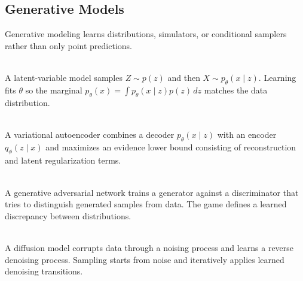 \subsection{Generative Models}

Generative modeling learns distributions, simulators, or conditional samplers rather than only point predictions.

\begin{definition} \label{def:sl-latent-variable-generative-model} \\
A latent-variable model samples $Z\sim p(z)$ and then $X\sim p_{\theta}(x\mid z)$.  Learning fits $\theta$ so the marginal $p_{\theta}(x)=\int p_{\theta}(x\mid z)p(z)\,dz$ matches the data distribution.
\end{definition}

\begin{definition} \label{def:sl-variational-autoencoder} \\
A variational autoencoder combines a decoder $p_{\theta}(x\mid z)$ with an encoder $q_{\phi}(z\mid x)$ and maximizes an evidence lower bound consisting of reconstruction and latent regularization terms.
\end{definition}

\begin{definition} \label{def:sl-generative-adversarial-network} \\
A generative adversarial network trains a generator against a discriminator that tries to distinguish generated samples from data.  The game defines a learned discrepancy between distributions.
\end{definition}

\begin{definition} \label{def:sl-diffusion-model} \\
A diffusion model corrupts data through a noising process and learns a reverse denoising process.  Sampling starts from noise and iteratively applies learned denoising transitions.
\end{definition}
